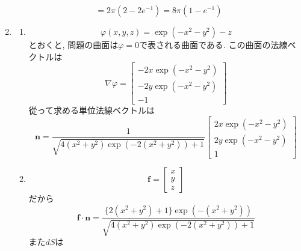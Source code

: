 \documentclass[a4paper,10pt,report]{amsart}
\theoremstyle{plain}
\theoremstyle{definition}
\theoremstyle{remark}
\begin{document}
\begin{enumerate}
\begin{equation*}
        \end{equation*}
        \begin{equation*}
            =2\pi(2-2e^{-1})=8\pi(1-e^{-1})
        \end{equation*}
        \item 
        \begin{enumerate}
            \item 
            \begin{equation*}
                \varphi(x,y,z)=\exp{(-x^{2}-y^{2})}-z
            \end{equation*}
            とおくと, 問題の曲面は\(\varphi=0\)で表される曲面である. この曲面の法線ベクトルは
            \begin{equation*}
                \nabla \varphi=\begin{bmatrix}
                    -2x\exp{(-x^{2}-y^{2})}\\
                    -2y\exp{(-x^{2}-y^{2})}\\
                    -1
                \end{bmatrix}
            \end{equation*}
            從って求める単位法線ベクトルは
            \begin{equation*}
                \bm{n}=\frac{1}{\sqrt{4(x^{2}+y^{2})\exp{(-2(x^{2}+y^{2}))}+1}}\begin{bmatrix}
                    2x\exp{(-x^{2}-y^{2})}\\
                    2y\exp{(-x^{2}-y^{2})}\\
                    1
                \end{bmatrix}
            \end{equation*}
            \item 
            \begin{equation*}
                \bm{f}=\begin{bmatrix}
                    x\\
                    y\\
                    z
                \end{bmatrix}
            \end{equation*}
            だから
            \begin{equation*}
                \bm{f}\cdot\bm{n}=\frac{\{2(x^{2}+y^{2})+1\}\exp{(-(x^{2}+y^{2}))}}{\sqrt{4(x^{2}+y^{2})\exp{(-2(x^{2}+y^{2}))}+1}}
            \end{equation*}
            また\(dS\)は
            \begin{equation*}

\end{equation*}
\end{enumerate}
\end{enumerate}
\end{document}
